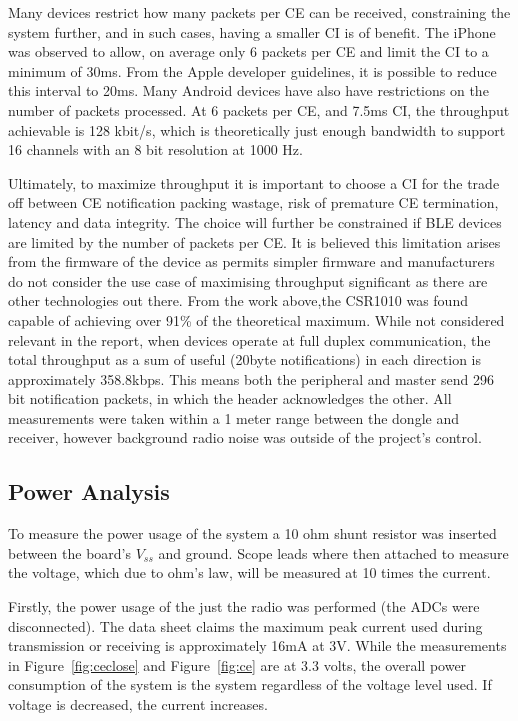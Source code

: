 \documentclass[]{article}
\begin{document}
 Many devices restrict how many packets per \ac{CE} can be received, constraining the system further, and in such cases, having a smaller \ac{CI} is of benefit. The iPhone was observed to allow, on average only 6 packets per \ac{CE} and limit the \ac{CI} to a minimum of 30ms. From the Apple developer guidelines, it is possible to reduce this interval to 20ms. Many Android devices have also have restrictions on the number of packets processed. At 6 packets per \ac{CE}, and 7.5ms \ac{CI}, the throughput achievable is 128 kbit/s, which is theoretically just enough bandwidth to support 16 channels with an 8 bit resolution at 1000 Hz.

Ultimately, to maximize throughput it is important to choose a \ac{CI} for the trade off between \ac{CE} notification packing wastage, risk of premature \ac{CE} termination, latency and data integrity. The choice will further be constrained if \ac{BLE} devices are limited by the number of packets per \ac{CE}. It is believed this limitation arises from the firmware of the device as permits simpler firmware and manufacturers do not consider the use case of maximising throughput significant as there are other technologies out there. From the work above,the CSR1010 was found capable of achieving over 91\% of the theoretical maximum. While not considered relevant in the report, when devices operate at full duplex communication, the total throughput as a sum of useful (20byte notifications) in each direction is approximately 358.8kbps. This means both the peripheral and master send 296 bit notification packets, in which the header acknowledges the other. All measurements were taken within a 1 meter range between the dongle and receiver, however background radio noise was outside of the project's control.













\clearpage
\subsection{Power Analysis}
\label{sec:Power Analysis}
To measure the power usage of the system a 10 ohm shunt resistor was inserted between the board's $V_{ss}$ and ground. Scope leads where then attached to measure the voltage, which due to ohm's law, will be measured at 10 times the current. 

Firstly, the power usage of the just the radio was performed (the ADCs were disconnected).  The data sheet claims the maximum peak current used during transmission or receiving is approximately 16mA at 3V. While the measurements in Figure~\ref{fig:ceclose} and Figure~\ref{fig:ce} are at 3.3 volts, the overall power consumption of the system is the system regardless of the voltage level used. If voltage is decreased, the current increases.
\end{document}
